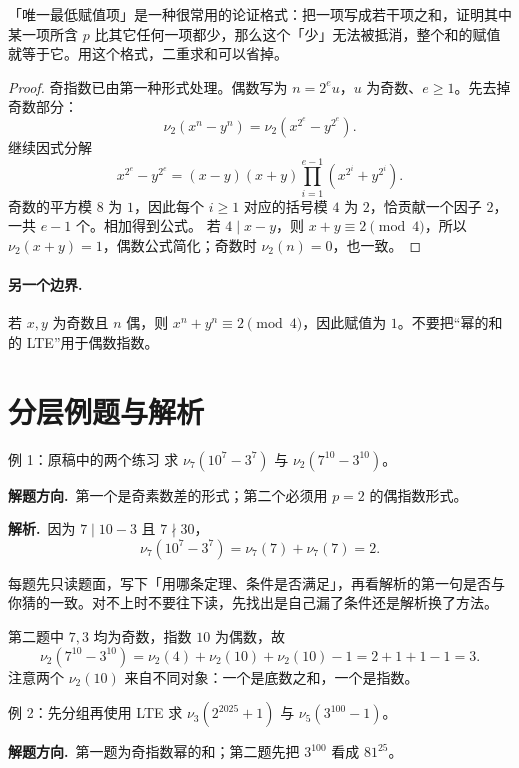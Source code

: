 \documentclass[UTF8,a4paper,11pt,oneside,openany,fontset=fandol]{ctexbook}
\theoremstyle{definition}
\newcommand{\sol}{\par\noindent\textbf{解析.}\ }
\newcommand{\hint}{\par\noindent\textbf{解题方向.}\ }
\begin{document}
\begin{tip}
「唯一最低赋值项」是一种很常用的论证格式：把一项写成若干项之和，证明其中某一项所含 $p$ 比其它任何一项都少，那么这个「少」无法被抵消，整个和的赋值就等于它。用这个格式，二重求和可以省掉。
\end{tip}


\begin{proof}
奇指数已由第一种形式处理。偶数写为 $n=2^e u$，$u$ 为奇数、$e\ge1$。先去掉奇数部分：
\[
\nu_2(x^n-y^n)=\nu_2(x^{2^e}-y^{2^e}).
\]
继续因式分解
\[
 x^{2^e}-y^{2^e}=(x-y)(x+y)\prod_{i=1}^{e-1}(x^{2^i}+y^{2^i}).
\]
奇数的平方模 $8$ 为 $1$，因此每个 $i\ge1$ 对应的括号模 $4$ 为 $2$，恰贡献一个因子 $2$，一共 $e-1$ 个。相加得到公式。
若 $4\mid x-y$，则 $x+y\equiv2\pmod4$，所以 $\nu_2(x+y)=1$，偶数公式简化；奇数时 $\nu_2(n)=0$，也一致。
\end{proof}
\paragraph{另一个边界.} 若 $x,y$ 为奇数且 $n$ 偶，则 $x^n+y^n\equiv2\pmod4$，因此赋值为 $1$。不要把“幂的和的 LTE”用于偶数指数。


\section{分层例题与解析}
\begin{problem}{例 1：原稿中的两个练习}
求 $\nu_7(10^7-3^7)$ 与 $\nu_2(7^{10}-3^{10})$。
\end{problem}
\hint 第一个是奇素数差的形式；第二个必须用 $p=2$ 的偶指数形式。

\sol 因为 $7\mid10-3$ 且 $7\nmid30$，
\[
 \nu_7(10^7-3^7)=\nu_7(7)+\nu_7(7)=2.
\]

\begin{tip}[怎么用一节里的例题]
每题先只读题面，写下「用哪条定理、条件是否满足」，再看解析的第一句是否与你猜的一致。对不上时不要往下读，先找出是自己漏了条件还是解析换了方法。
\end{tip}

第二题中 $7,3$ 均为奇数，指数 $10$ 为偶数，故
\[
 \nu_2(7^{10}-3^{10})=\nu_2(4)+\nu_2(10)+\nu_2(10)-1=2+1+1-1=3.
\]
注意两个 $\nu_2(10)$ 来自不同对象：一个是底数之和，一个是指数。


\begin{problem}{例 2：先分组再使用 LTE}
求 $\nu_3(2^{2025}+1)$ 与 $\nu_5(3^{100}-1)$。
\end{problem}
\hint 第一题为奇指数幂的和；第二题先把 $3^{100}$ 看成 $81^{25}$。
\end{document}
